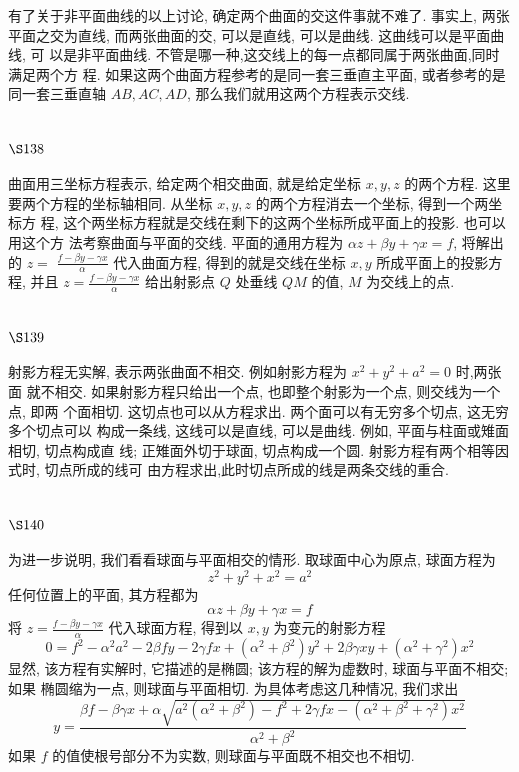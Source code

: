 有了关于非平面曲线的以上讨论, 确定两个曲面的交这件事就不难了. 事实上, 两张 平面之交为直线, 而两张曲面的交, 可以是直线, 可以是曲线. 这曲线可以是平面曲线, 可 以是非平面曲线. 不管是哪一种,这交线上的每一点都同属于两张曲面,同时满足两个方 程. 如果这两个曲面方程参考的是同一套三垂直主平面, 或者参考的是同一套三垂直轴 $A B, A C, A D$, 那么我们就用这两个方程表示交线.

\section{$\S 138$}

曲面用三坐标方程表示, 给定两个相交曲面, 就是给定坐标 $x, y, z$ 的两个方程. 这里 要两个方程的坐标轴相同. 从坐标 $x, y, z$ 的两个方程消去一个坐标, 得到一个两坐标方 程, 这个两坐标方程就是交线在剩下的这两个坐标所成平面上的投影. 也可以用这个方 法考察曲面与平面的交线. 平面的通用方程为 $\alpha z+\beta y+\gamma x=f$, 将解出的 $z=$ $\frac{f-\beta y-\gamma x}{\alpha}$ 代入曲面方程, 得到的就是交线在坐标 $x, y$ 所成平面上的投影方程, 并且 $z=\frac{f-\beta y-\gamma x}{\alpha}$ 给出射影点 $Q$ 处垂线 $Q M$ 的值, $M$ 为交线上的点.

\section{$\S 139$}

射影方程无实解, 表示两张曲面不相交. 例如射影方程为 $x^{2}+y^{2}+a^{2}=0$ 时,两张面 就不相交. 如果射影方程只给出一个点, 也即整个射影为一个点, 则交线为一个点, 即两 个面相切. 这切点也可以从方程求出. 两个面可以有无穷多个切点, 这无穷多个切点可以 构成一条线, 这线可以是直线, 可以是曲线. 例如, 平面与柱面或雉面相切, 切点构成直 线; 正雉面外切于球面, 切点构成一个圆. 射影方程有两个相等因式时, 切点所成的线可 由方程求出,此时切点所成的线是两条交线的重合.

\section{$\S 140$}

为进一步说明, 我们看看球面与平面相交的情形. 取球面中心为原点, 球面方程为
\[
z^{2}+y^{2}+x^{2}=a^{2}
\]
任何位置上的平面, 其方程都为
\[
\alpha z+\beta y+\gamma x=f
\]
将 $z=\frac{f-\beta y-\gamma x}{\alpha}$ 代入球面方程, 得到以 $x, y$ 为变元的射影方程
\[
0=f^{2}-\alpha^{2} a^{2}-2 \beta f y-2 \gamma f x+\left(\alpha^{2}+\beta^{2}\right) y^{2}+2 \beta \gamma x y+\left(\alpha^{2}+\gamma^{2}\right) x^{2}
\]
显然, 该方程有实解时, 它描述的是椭圆; 该方程的解为虚数时, 球面与平面不相交; 如果 椭圆缩为一点, 则球面与平面相切. 为具体考虑这几种情况, 我们求出
\[
y=\frac{\beta f-\beta \gamma x+\alpha \sqrt{a^{2}\left(\alpha^{2}+\beta^{2}\right)-f^{2}+2 \gamma f x-\left(\alpha^{2}+\beta^{2}+\gamma^{2}\right) x^{2}}}{\alpha^{2}+\beta^{2}}
\]
如果 $f$ 的值使根号部分不为实数, 则球面与平面既不相交也不相切.

